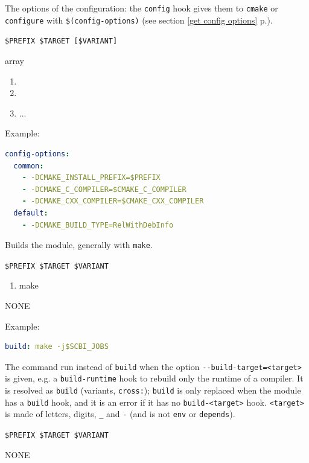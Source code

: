 \documentclass[a4paper,12pt,twoside]{article}
\newcommand{\code}[1]{\texttt{#1}}
\newcommand{\seeref}[1]{see section \ref{#1} p.\pageref{#1}}
\newcommand{\ddash}{-{}-}
\begin{document}
\begin{description}[font=\large\texttt]
	\item[config-options {[}common|<variant>{]}] The options of the configuration: the \code{config} hook gives them to \code{cmake} or \code{configure} with \code{\$(config-options)} (\seeref{get config options}).
	\begin{description}[font=\textit,style=standard]
		\item[parameter] \tabto{2cm} \code{\$PREFIX \$TARGET [\$VARIANT]}
		\item[return] \tabto{2cm} array
		\begin{enumerate}
			\item <option1>
			\item <option2>
			\item ...
		\end{enumerate}
	\end{description}
	Example:
\begin{lstlisting}[language={yaml}]
config-options:
  common:
    - -DCMAKE_INSTALL_PREFIX=$PREFIX
    - -DCMAKE_C_COMPILER=$CMAKE_C_COMPILER
    - -DCMAKE_CXX_COMPILER=$CMAKE_CXX_COMPILER
  default:
    - -DCMAKE_BUILD_TYPE=RelWithDebInfo
\end{lstlisting}

	\item[build {[}<variant>{]}] Builds the module, generally with \code{make}.
	\begin{description}[font=\textit,style=standard]
		\item[parameter] \tabto{2cm} \code{\$PREFIX \$TARGET \$VARIANT}
		\begin{enumerate}
			\item make
		\end{enumerate}
		\item[return] \tabto{2cm} NONE
	\end{description}
	Example:
\begin{lstlisting}[language={yaml}]
build: make -j$SCBI_JOBS
\end{lstlisting}

	\item[build-<target> {[}<variant>{]}] The
	command run instead of \code{build} when the option
	\code{\ddash{}build-target=<target>} is given, e.g. a \code{build-runtime}
	hook to rebuild only the runtime of a compiler. It is resolved as
	\code{build} (variants, \code{cross:}); \code{build} is only replaced
	when the module has a \code{build} hook, and it is an error if it has no
	\code{build-<target>} hook. \code{<target>} is made of letters, digits,
	\code{\_} and \code{-} (and is not \code{env} or \code{depends}).
	\begin{description}[font=\textit,style=standard]
		\item[parameter] \tabto{2cm} \code{\$PREFIX \$TARGET \$VARIANT}
		\item[return] \tabto{2cm} NONE
	\end{description}


\end{description}
\end{document}
